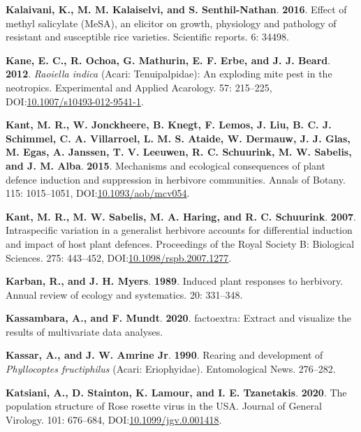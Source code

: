 \documentclass[12pt,final,CPage]{ufthesis}
\newlength{\cslhangindent}
\newenvironment{CSLReferences}[2] %
{%
	\setlength{\parindent}{0pt}
	\ifodd #1 \everypar{\setlength{\hangindent}{\cslhangindent}}\ignorespaces\fi
	\ifnum #2 > 0
	\setlength{\parskip}{#2\baselineskip}
	\fi
}%
{}
\begin{document}
{\begin{CSLReferences}{1}{0}
  \leavevmode{}%
  \textbf{Kalaivani, K., M. M. Kalaiselvi, and S. Senthil-Nathan}. \textbf{2016}. Effect of methyl salicylate {(MeSA)}, an elicitor on growth, physiology and pathology of resistant and susceptible rice varieties. Scientific reports. 6: 34498.

  \leavevmode{}%
  \textbf{Kane, E. C., R. Ochoa, G. Mathurin, E. F. Erbe, and J. J. Beard}. \textbf{2012}. {\emph{Raoiella indica}} ({Acari}: {Tenuipalpidae}): An exploding mite pest in the neotropics. Experimental and Applied Acarology. 57: 215--225, DOI:\href{https://doi.org/10.1007/s10493-012-9541-1}{10.1007/s10493-012-9541-1}.

  \leavevmode{}%
  \textbf{Kant, M. R., W. Jonckheere, B. Knegt, F. Lemos, J. Liu, B. C. J. Schimmel, C. A. Villarroel, L. M. S. Ataide, W. Dermauw, J. J. Glas, M. Egas, A. Janssen, T. V. Leeuwen, R. C. Schuurink, M. W. Sabelis, and J. M. Alba}. \textbf{2015}. Mechanisms and ecological consequences of plant defence induction and suppression in herbivore communities. Annals of Botany. 115: 1015--1051, DOI:\href{https://doi.org/10.1093/aob/mcv054}{10.1093/aob/mcv054}.

  \leavevmode{}%
  \textbf{Kant, M. R., M. W. Sabelis, M. A. Haring, and R. C. Schuurink}. \textbf{2007}. Intraspecific variation in a generalist herbivore accounts for differential induction and impact of host plant defences. Proceedings of the Royal Society B: Biological Sciences. 275: 443--452, DOI:\href{https://doi.org/10.1098/rspb.2007.1277}{10.1098/rspb.2007.1277}.

  \leavevmode{}%
  \textbf{Karban, R., and J. H. Myers}. \textbf{1989}. Induced plant responses to herbivory. Annual review of ecology and systematics. 20: 331--348.

  \leavevmode{}%
  \textbf{Kassambara, A., and F. Mundt}. \textbf{2020}. {factoextra}: Extract and visualize the results of multivariate data analyses.

  \leavevmode{}%
  \textbf{Kassar, A., and J. W. Amrine Jr}. \textbf{1990}. Rearing and development of {\emph{Phyllocoptes fructiphilus}} ({Acari}: {Eriophyidae}). Entomological News. 276--282.

  \leavevmode{}%
  \textbf{Katsiani, A., D. Stainton, K. Lamour, and I. E. Tzanetakis}. \textbf{2020}. The population structure of {Rose rosette virus} in the {USA}. Journal of General Virology. 101: 676--684, DOI:\href{https://doi.org/10.1099/jgv.0.001418}{10.1099/jgv.0.001418}.


\end{CSLReferences}}
\end{document}
